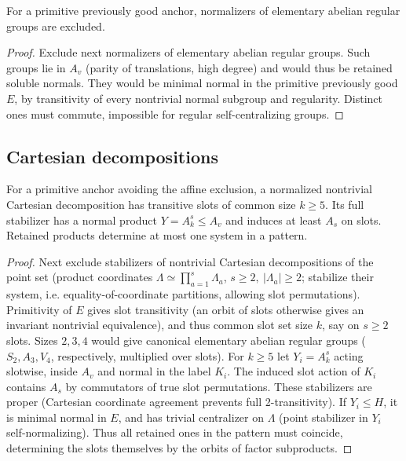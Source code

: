 \begin{proposition}\label{c:alternating-affine}
For a primitive previously good anchor, normalizers of elementary abelian regular groups are excluded.
\end{proposition}

\begin{proof}
Exclude next normalizers of elementary abelian regular groups. Such groups lie in \(A_v\) (parity of translations, high degree) and would thus be retained soluble normals. They would be minimal normal in the primitive previously good \(E\), by transitivity of every nontrivial normal subgroup and regularity. Distinct ones must commute, impossible for regular self-centralizing groups.
\end{proof}

\subsection{Cartesian decompositions}

\begin{lemma}\label{c:cartesian-retained}
For a primitive anchor avoiding the affine exclusion, a normalized nontrivial Cartesian decomposition has transitive slots of common size \(k\ge5\). Its full stabilizer has a normal product \(Y=A_k^s\le A_v\) and induces at least \(A_s\) on slots. Retained products determine at most one system in a pattern.
\end{lemma}

\begin{proof}
Next exclude stabilizers of nontrivial Cartesian decompositions of the point set (product coordinates \(\Lambda\simeq\prod_{a=1}^s \Lambda_a\), \(s\ge2,\ |\Lambda_a|\ge2\); stabilize their system, i.e. equality-of-coordinate partitions, allowing slot permutations). Primitivity of \(E\) gives slot transitivity (an orbit of slots otherwise gives an invariant nontrivial equivalence), and thus common slot set size \(k\), say on \(s\ge2\) slots. Sizes \(2,3,4\) would give canonical elementary abelian regular groups (\(S_2,A_3,V_4\), respectively, multiplied over slots). For \(k\ge5\) let \(Y_i=A_k^s\) acting slotwise, inside \(A_v\) and normal in the label \(K_i\). The induced slot action of \(K_i\) contains \(A_s\) by commutators of true slot permutations. These stabilizers are proper (Cartesian coordinate agreement prevents full 2-transitivity). If \(Y_i\le H\), it is minimal normal in \(E\), and has trivial centralizer on \(\Lambda\) (point stabilizer in \(Y_i\) self-normalizing). Thus all retained ones in the pattern must coincide, determining the slots themselves by the orbits of factor subproducts.
\end{proof}

